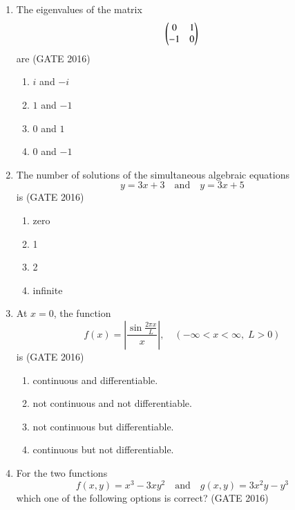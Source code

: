 \documentclass[journal,12pt,onecolumn]{IEEEtran}
\theoremstyle{remark}
\begin{document}
\begin{enumerate}

\item The eigenvalues of the matrix
\[
\begin{pmatrix}0 & 1 \\ -1 & 0\end{pmatrix}
\]
are  
\hfill{(GATE 2016)}

\begin{multicols}{4}
\begin{enumerate}
    \item $i$ and $-i$
    \item $1$ and $-1$
    \item $0$ and $1$
    \item $0$ and $-1$
\end{enumerate}
\end{multicols}
\vspace{1cm}

\item The number of solutions of the simultaneous algebraic equations 
\[
y = 3x+3 \quad \text{and} \quad y=3x+5
\]
is  
\hfill{(GATE 2016)}

\begin{multicols}{4}
\begin{enumerate}
    \item zero
    \item 1
    \item 2
    \item infinite
\end{enumerate}
\end{multicols}
\vspace{1cm}

\item At $x=0$, the function
\[
f(x) = \left|\frac{\sin \frac{2\pi x}{L}}{x}\right|, \quad (-\infty < x < \infty, \; L>0)
\]
is  
\hfill{(GATE 2016)}

\begin{enumerate}
    \item continuous and differentiable.
    \item not continuous and not differentiable.
    \item not continuous but differentiable.
    \item continuous but not differentiable.
\end{enumerate}
\vspace{1cm}

\item For the two functions 
\[
f(x,y) = x^3 - 3xy^2 \quad \text{and} \quad g(x,y) = 3x^2y - y^3
\]
which one of the following options is correct?  
\hfill{(GATE 2016)}


\end{enumerate}
\end{document}
